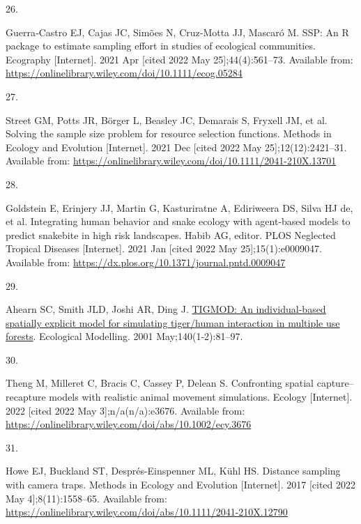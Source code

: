 \documentclass[10pt,a4paper]{article}
\newlength{\cslhangindent}
\newlength{\csllabelwidth}
\newlength{\cslentryspacingunit} %
\newenvironment{CSLReferences}[2] %
 {%
  \setlength{\parindent}{0pt}
  \ifodd #1
  \let\oldpar\par
  \def\par{\hangindent=\cslhangindent\oldpar}
  \fi
  \setlength{\parskip}{#2\cslentryspacingunit}
 }%
 {}
\newcommand{\CSLLeftMargin}[1]{\parbox[t]{\csllabelwidth}{#1}}
\newcommand{\CSLRightInline}[1]{\parbox[t]{\linewidth - \csllabelwidth}{#1}\break}
\begin{document}
\begin{CSLReferences}{0}{0}
\leavevmode{}%
\CSLLeftMargin{26. }
\CSLRightInline{Guerra‐Castro EJ, Cajas JC, Simões N, Cruz‐Motta JJ, Mascaró M. {SSP}: An {R} package to estimate sampling effort in studies of ecological communities. Ecography {[}Internet{]}. 2021 Apr {[}cited 2022 May 25{]};44(4):561--73. Available from: \url{https://onlinelibrary.wiley.com/doi/10.1111/ecog.05284}}

\leavevmode{}%
\CSLLeftMargin{27. }
\CSLRightInline{Street GM, Potts JR, Börger L, Beasley JC, Demarais S, Fryxell JM, et al. Solving the sample size problem for resource selection functions. Methods in Ecology and Evolution {[}Internet{]}. 2021 Dec {[}cited 2022 May 25{]};12(12):2421--31. Available from: \url{https://onlinelibrary.wiley.com/doi/10.1111/2041-210X.13701}}

\leavevmode{}%
\CSLLeftMargin{28. }
\CSLRightInline{Goldstein E, Erinjery JJ, Martin G, Kasturiratne A, Ediriweera DS, Silva HJ de, et al. Integrating human behavior and snake ecology with agent-based models to predict snakebite in high risk landscapes. Habib AG, editor. PLOS Neglected Tropical Diseases {[}Internet{]}. 2021 Jan {[}cited 2022 May 25{]};15(1):e0009047. Available from: \url{https://dx.plos.org/10.1371/journal.pntd.0009047}}

\leavevmode{}%
\CSLLeftMargin{29. }
\CSLRightInline{Ahearn SC, Smith JLD, Joshi AR, Ding J. \href{https://doi.org/10.1016/S0304-3800(01)00258-7}{{TIGMOD}: {An} individual-based spatially explicit model for simulating tiger/human interaction in multiple use forests}. Ecological Modelling. 2001 May;140(1-2):81--97. }

\leavevmode{}%
\CSLLeftMargin{30. }
\CSLRightInline{Theng M, Milleret C, Bracis C, Cassey P, Delean S. Confronting spatial capture--recapture models with realistic animal movement simulations. Ecology {[}Internet{]}. 2022 {[}cited 2022 May 3{]};n/a(n/a):e3676. Available from: \url{https://onlinelibrary.wiley.com/doi/abs/10.1002/ecy.3676}}

\leavevmode{}%
\CSLLeftMargin{31. }
\CSLRightInline{Howe EJ, Buckland ST, Després-Einspenner ML, Kühl HS. Distance sampling with camera traps. Methods in Ecology and Evolution {[}Internet{]}. 2017 {[}cited 2022 May 4{]};8(11):1558--65. Available from: \url{https://onlinelibrary.wiley.com/doi/abs/10.1111/2041-210X.12790}}


\end{CSLReferences}
\end{document}
